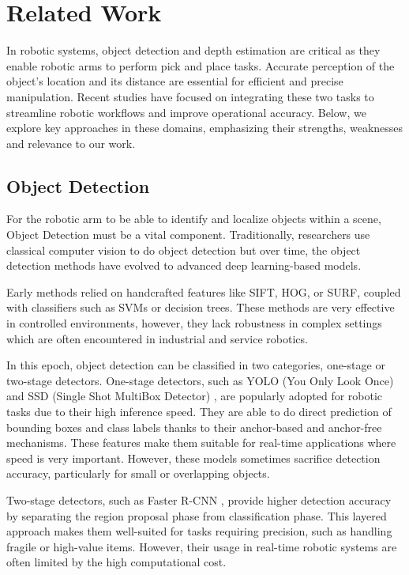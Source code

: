 \section{Related Work}
In robotic systems, object detection and depth estimation are critical as they enable robotic arms to perform pick and place tasks. Accurate perception of the object’s location and its distance are essential for efficient and precise manipulation. Recent studies have focused on integrating these two tasks to streamline robotic workflows and improve operational accuracy.
Below, we explore key approaches in these domains, emphasizing their strengths, weaknesses and relevance to our work.


\subsection{Object Detection}
For the robotic arm to be able to identify and localize objects within a scene, Object Detection must be a vital component. Traditionally, researchers use classical computer vision to do object detection but over time, the object detection methods have evolved to advanced deep learning-based models.


Early methods relied on handcrafted features like SIFT, HOG, or SURF, coupled with classifiers such as SVMs or decision trees. These methods are very effective in controlled environments, however, they lack robustness in complex settings which are often encountered in industrial and service robotics.


In this epoch, object detection can be classified in two categories, one-stage or two-stage detectors. One-stage detectors, such as YOLO (You Only Look Once) \cite{redmon2018yolov3:anincrementalimprovement} and SSD (Single Shot MultiBox Detector) \cite{liu2016ssd:singleshotmultiboxdetector}, are popularly adopted for robotic tasks due to their high inference speed. They are able to do direct prediction of bounding boxes and class labels thanks to their anchor-based and anchor-free mechanisms. These features make them suitable for real-time applications where speed is very important. However, these models sometimes sacrifice detection accuracy, particularly for small or overlapping objects.


Two-stage detectors, such as Faster R-CNN \cite{ren2016fasterr-cnn}, provide higher detection accuracy by separating the region proposal phase from classification phase. This layered approach makes them well-suited for tasks requiring precision, such as handling fragile or high-value items. However, their usage in real-time robotic systems are often limited by the high computational cost.


